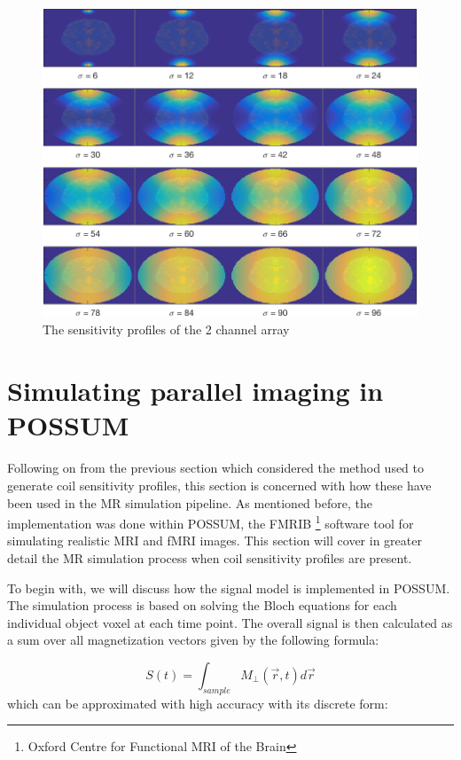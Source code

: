 \begin{figure}[H]
    \centering
    \includegraphics[width=1\textwidth,keepaspectratio]{2coilsdifsigmas}
    \caption{The sensitivity profiles of the 2 channel array}
    \label{fig:2coilsdifsigmas}
\end{figure}

\section{Simulating parallel imaging in POSSUM}
Following on from the previous section which considered the method used to generate coil sensitivity profiles, this section is concerned with how these have been used in the MR simulation pipeline. As mentioned before, the implementation was done within POSSUM, the FMRIB \footnote{Oxford Centre for Functional MRI of the Brain} software tool for simulating realistic MRI and fMRI images. This section will cover in greater detail the MR simulation process when coil sensitivity profiles are present.

To begin with, we will discuss how the signal model is implemented in POSSUM. The simulation process is based on solving the Bloch equations for each individual object voxel at each time point. The overall signal is then calculated as a sum over all magnetization vectors given by the following formula:

\begin{equation} \label{eq:41}
    S(t) = \int_{sample} M_{\perp} (\vec{r}, t) d \vec{r}
\end{equation}
which can be approximated with high accuracy with its discrete form:

